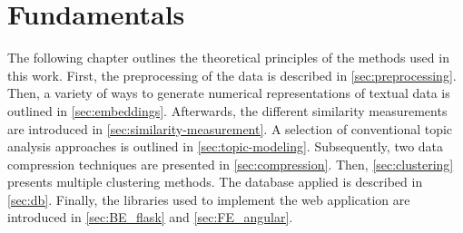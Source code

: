 \chapter{Fundamentals}\label{ch:methodology} %

The following chapter outlines the theoretical principles of the methods used in this work.
First, the preprocessing of the data is described in \autoref{sec:preprocessing}.
Then, a variety of ways to generate numerical representations of textual data is outlined in \autoref{sec:embeddings}.
Afterwards, the different similarity measurements are introduced in \autoref{sec:similarity-measurement}.
A selection of conventional topic analysis approaches is outlined in \autoref{sec:topic-modeling}.
Subsequently, two data compression techniques are presented in \autoref{sec:compression}.
Then, \autoref{sec:clustering} presents multiple clustering methods.
The database applied is described in \autoref{sec:db}.
Finally, the libraries used to implement the web application are introduced in \autoref{sec:BE_flask} and \autoref{sec:FE_angular}.

























